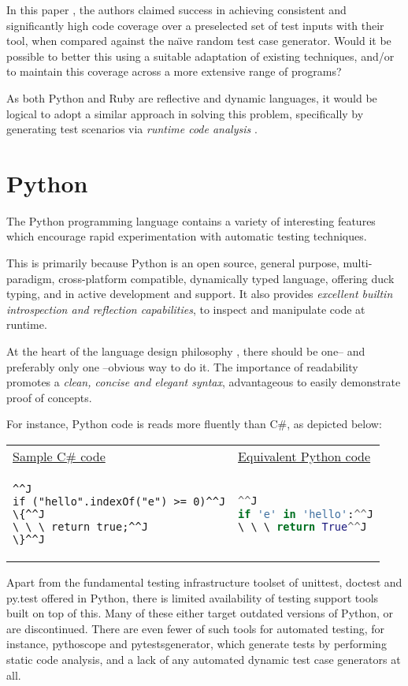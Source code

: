 \documentclass{icldt}
\numberwithin{equation}{section}       %
\def\naive{na\"{\i}ve }
\begin{document}
In this paper \cite{Mairhofer2011}, the authors claimed success in achieving consistent and significantly high code coverage over a preselected set of test inputs with their tool, when compared against the \naive random test case generator. Would it be possible to better this using a suitable adaptation of existing techniques, and/or to maintain this coverage across a more extensive range of programs?

As both Python and Ruby are reflective and dynamic languages, it would be logical to adopt a similar approach in solving this problem, specifically by generating test scenarios via \emph{runtime code analysis} \cite{Mairhofer2011}.
\section{Python}
The Python programming language contains a variety of interesting features which encourage rapid experimentation with automatic testing techniques.

This is primarily because Python is an open source, general purpose, multi-paradigm, cross-platform compatible, dynamically typed language, offering duck typing, and in active development and support. It also provides \emph{excellent builtin introspection and reflection capabilities}, to inspect and manipulate code at runtime.

At the heart of the language design philosophy \cite{Pep20ZenPython}, there should be one-- and preferably only one --obvious way to do it. The importance of readability promotes a \emph{clean, concise and elegant syntax}, advantageous to easily demonstrate proof of concepts.

For instance, Python code is reads more fluently than C\#, as depicted below:

\begin{tabularx}{\textwidth}{X X}
\underline{Sample C\# code} & \underline{Equivalent Python code} \\
\begin{lstlisting}[language=CSharp]^^J
if ("hello".indexOf("e") >= 0)^^J
\{^^J
\ \ \ return true;^^J
\}^^J
\end{lstlisting}
&
\begin{lstlisting}[language=python]^^J
if 'e' in 'hello':^^J
\ \ \ return True^^J
\end{lstlisting}
\end{tabularx}
Apart from the fundamental testing infrastructure toolset of \textsf{unittest}, \textsf{doctest} and \textsf{py.test} offered in Python, there is limited availability of testing support tools built on top of this. Many of these either target outdated versions of Python, or are discontinued. There are even fewer of such tools for automated testing, for instance, \textsf{pythoscope} and \textsf{pytestsgenerator}, which generate tests by performing static code analysis, and a lack of any automated dynamic test case generators at all.
\end{document}
